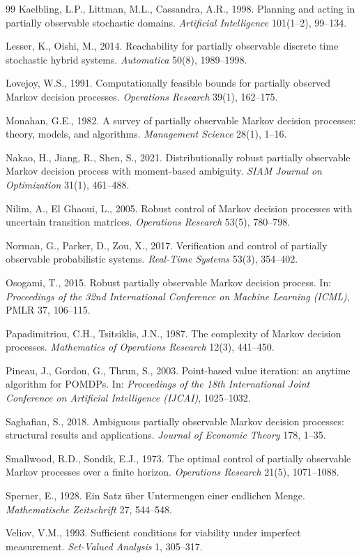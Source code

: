 \documentclass[11pt,a4paper]{article}
\theoremstyle{plain}
\theoremstyle{definition}
\theoremstyle{remark}
\begin{document}
\begin{thebibliography}{99}
 Kaelbling, L.P., Littman, M.L., Cassandra, A.R., 1998. Planning and acting in partially observable stochastic domains. \emph{Artificial Intelligence} 101(1--2), 99--134.

 Lesser, K., Oishi, M., 2014. Reachability for partially observable discrete time stochastic hybrid systems. \emph{Automatica} 50(8), 1989--1998.

 Lovejoy, W.S., 1991. Computationally feasible bounds for partially observed Markov decision processes. \emph{Operations Research} 39(1), 162--175.

 Monahan, G.E., 1982. A survey of partially observable Markov decision processes: theory, models, and algorithms. \emph{Management Science} 28(1), 1--16.

 Nakao, H., Jiang, R., Shen, S., 2021. Distributionally robust partially observable Markov decision process with moment-based ambiguity. \emph{SIAM Journal on Optimization} 31(1), 461--488.

 Nilim, A., El Ghaoui, L., 2005. Robust control of Markov decision processes with uncertain transition matrices. \emph{Operations Research} 53(5), 780--798.

 Norman, G., Parker, D., Zou, X., 2017. Verification and control of partially observable probabilistic systems. \emph{Real-Time Systems} 53(3), 354--402.

 Osogami, T., 2015. Robust partially observable Markov decision process. In: \emph{Proceedings of the 32nd International Conference on Machine Learning (ICML)}, PMLR 37, 106--115.

 Papadimitriou, C.H., Tsitsiklis, J.N., 1987. The complexity of Markov decision processes. \emph{Mathematics of Operations Research} 12(3), 441--450.

 Pineau, J., Gordon, G., Thrun, S., 2003. Point-based value iteration: an anytime algorithm for POMDPs. In: \emph{Proceedings of the 18th International Joint Conference on Artificial Intelligence (IJCAI)}, 1025--1032.

 Saghafian, S., 2018. Ambiguous partially observable Markov decision processes: structural results and applications. \emph{Journal of Economic Theory} 178, 1--35.

 Smallwood, R.D., Sondik, E.J., 1973. The optimal control of partially observable Markov processes over a finite horizon. \emph{Operations Research} 21(5), 1071--1088.

 Sperner, E., 1928. Ein Satz \"uber Untermengen einer endlichen Menge. \emph{Mathematische Zeitschrift} 27, 544--548.

 Veliov, V.M., 1993. Sufficient conditions for viability under imperfect measurement. \emph{Set-Valued Analysis} 1, 305--317.

\end{thebibliography}
\end{document}
